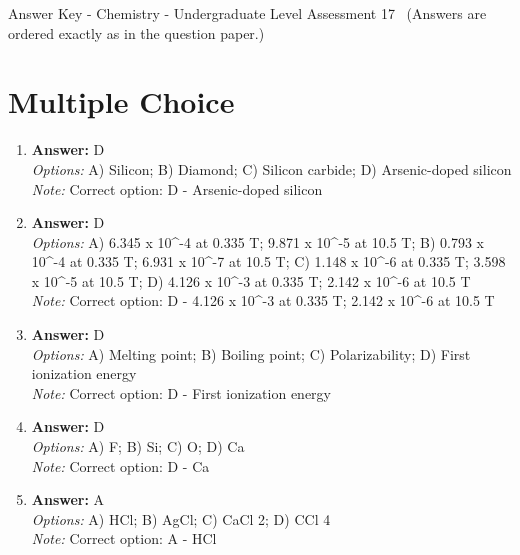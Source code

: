 \documentclass[12pt]{article}
\begin{document}
\begin{center}
Answer Key - Chemistry - Undergraduate Level Assessment 17 \
\small (Answers are ordered exactly as in the question paper.)
\end{center}

\section*{Multiple Choice}
\begin{enumerate}[label=\arabic*.]
\item \textbf{Answer:} D
\\ \textit{Options:} A) Silicon; B) Diamond; C) Silicon carbide; D) Arsenic-doped silicon
\\ \textit{Note:} Correct option: D - Arsenic-doped silicon
\item \textbf{Answer:} D
\\ \textit{Options:} A) 6.345 x 10^-4 at 0.335 T; 9.871 x 10^-5 at 10.5 T; B) 0.793 x 10^-4 at 0.335 T; 6.931 x 10^-7 at 10.5 T; C) 1.148 x 10^-6 at 0.335 T; 3.598 x 10^-5 at 10.5 T; D) 4.126 x 10^-3 at 0.335 T; 2.142 x 10^-6 at 10.5 T
\\ \textit{Note:} Correct option: D - 4.126 x 10^-3 at 0.335 T; 2.142 x 10^-6 at 10.5 T
\item \textbf{Answer:} D
\\ \textit{Options:} A) Melting point; B) Boiling point; C) Polarizability; D) First ionization energy
\\ \textit{Note:} Correct option: D - First ionization energy
\item \textbf{Answer:} D
\\ \textit{Options:} A) F; B) Si; C) O; D) Ca
\\ \textit{Note:} Correct option: D - Ca
\item \textbf{Answer:} A
\\ \textit{Options:} A) HCl; B) AgCl; C) CaCl 2; D) CCl 4
\\ \textit{Note:} Correct option: A - HCl
\end{enumerate}
\end{document}
